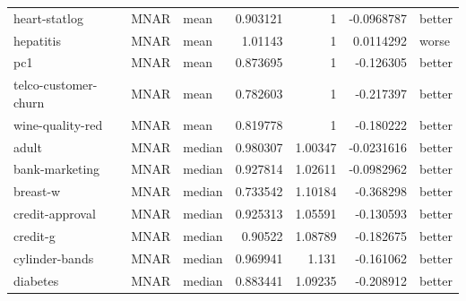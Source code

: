 \begin{table}[ht]
\begin{tabular}{lllrrrl}
 heart-statlog        & MNAR        & mean             &                                 0.903121 &                             1        &                    -0.0968787  & better               \\
 hepatitis            & MNAR        & mean             &                                 1.01143  &                             1        &                     0.0114292  & worse                \\
 pc1                  & MNAR        & mean             &                                 0.873695 &                             1        &                    -0.126305   & better               \\
 telco-customer-churn & MNAR        & mean             &                                 0.782603 &                             1        &                    -0.217397   & better               \\
 wine-quality-red     & MNAR        & mean             &                                 0.819778 &                             1        &                    -0.180222   & better               \\
 adult                & MNAR        & median           &                                 0.980307 &                             1.00347  &                    -0.0231616  & better               \\
 bank-marketing       & MNAR        & median           &                                 0.927814 &                             1.02611  &                    -0.0982962  & better               \\
 breast-w             & MNAR        & median           &                                 0.733542 &                             1.10184  &                    -0.368298   & better               \\
 credit-approval      & MNAR        & median           &                                 0.925313 &                             1.05591  &                    -0.130593   & better               \\
 credit-g             & MNAR        & median           &                                 0.90522  &                             1.08789  &                    -0.182675   & better               \\
 cylinder-bands       & MNAR        & median           &                                 0.969941 &                             1.131    &                    -0.161062   & better               \\
 diabetes             & MNAR        & median           &                                 0.883441 &                             1.09235  &                    -0.208912   & better               \\

\end{tabular}
\end{table}
